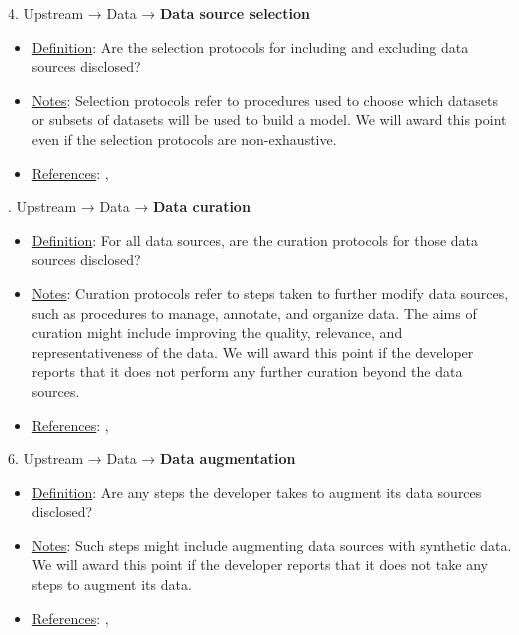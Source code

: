 4. Upstream → Data → \textbf{Data source selection}
\vspace{-\parskip}
\begin{itemize}
	\item
	\underline{Definition}: Are the selection protocols for including and excluding data sources disclosed?
	\item
	\underline{Notes}: Selection protocols refer to procedures used to choose which datasets or subsets of datasets will be used to build a model. We will award this point even if the selection protocols are non-exhaustive.
	\item
	\underline{References}: \citet{gebru2021datasheets}, \citet{hutchinson2021towards}
\end{itemize} \vspace{\baselineskip}


. Upstream → Data → \textbf{Data curation}
\vspace{-\parskip}
\begin{itemize}
	\item
	\underline{Definition}: For all data sources, are the curation protocols for those data sources disclosed?
	\item
	\underline{Notes}: Curation protocols refer to steps taken to further modify data sources, such as procedures to manage, annotate, and organize data. The aims of curation might include improving the quality, relevance, and representativeness of the data. We will award this point if the developer reports that it does not perform any further curation beyond the data sources.
	\item
	\underline{References}: \citet{gebru2021datasheets}, \citet{hutchinson2021towards}
\end{itemize} \vspace{\baselineskip}


6. Upstream → Data → \textbf{Data augmentation}
\vspace{-\parskip}
\begin{itemize}
	\item
	\underline{Definition}: Are any steps the developer takes to augment its data sources disclosed?
	\item
	\underline{Notes}: Such steps might include augmenting data sources with synthetic data. We will award this point if the developer reports that it does not take any steps to augment its data.
	\item
	\underline{References}: \citet{gebru2021datasheets}, \citet{hutchinson2021towards}
\end{itemize} \vspace{\baselineskip}


